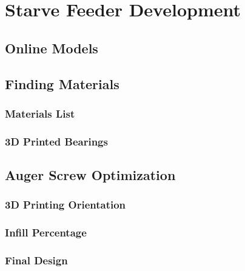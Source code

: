\newpage
\section{Starve Feeder Development\label{methedology:starveFeeder}}

\subsection{Online Models\label{sec:methedology:starveFeeder:onlineModels}}

\subsection{Finding Materials\label{sec:methedology:starveFeeder:findingMaterials}}

\subsubsection{Materials List\label{sec:methedology:starveFeeder:findingMaterials:materialsList}}

\subsubsection{3D Printed Bearings\label{sec:methedology:starveFeeder:findingMaterials:3dPrintedBearings}}

\subsection{Auger Screw Optimization\label{sec:methedology:starveFeeder:augerScrewOptimization}}

\subsubsection{3D Printing Orientation\label{sec:methedology:starveFeeder:augerScrewOptimization:3dPrintingOrientation}}

\subsubsection{Infill Percentage\label{sec:methedology:starveFeeder:augerScrewOptimization:infillPercentage}}

\subsubsection{Final Design\label{sec:methedology:starveFeeder:augerScrewOptimization:finalDesign}}

